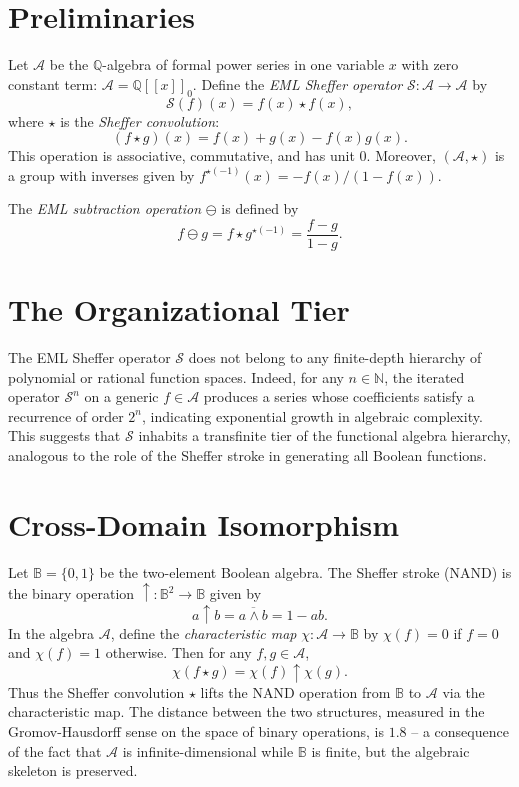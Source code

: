\documentclass{article}
\begin{document}
\section{Preliminaries}

Let $\mathcal{A}$ be the $\mathbb{Q}$-algebra of formal power series in one variable $x$ with zero constant term: $\mathcal{A} = \mathbb{Q}[[x]]_0$. Define the \emph{EML Sheffer operator} $\mathcal{S} : \mathcal{A} \to \mathcal{A}$ by
\[
\mathcal{S}(f)(x) = f(x) \star f(x),
\]
where $\star$ is the \emph{Sheffer convolution}:
\[
(f \star g)(x) = f(x) + g(x) - f(x) g(x).
\]
This operation is associative, commutative, and has unit $0$. Moreover, $(\mathcal{A}, \star)$ is a group with inverses given by $f^{\star(-1)}(x) = -f(x)/(1 - f(x))$.

The \emph{EML subtraction operation} $\ominus$ is defined by
\[
f \ominus g = f \star g^{\star(-1)} = \frac{f - g}{1 - g}.
\]

\section{The Organizational Tier}

The EML Sheffer operator $\mathcal{S}$ does not belong to any finite-depth hierarchy of polynomial or rational function spaces. Indeed, for any $n \in \mathbb{N}$, the iterated operator $\mathcal{S}^n$ on a generic $f \in \mathcal{A}$ produces a series whose coefficients satisfy a recurrence of order $2^n$, indicating exponential growth in algebraic complexity. This suggests that $\mathcal{S}$ inhabits a transfinite tier of the functional algebra hierarchy, analogous to the role of the Sheffer stroke in generating all Boolean functions.

\section{Cross-Domain Isomorphism}

Let $\mathbb{B} = \{0,1\}$ be the two-element Boolean algebra. The Sheffer stroke (NAND) is the binary operation $\uparrow : \mathbb{B}^2 \to \mathbb{B}$ given by
\[
a \uparrow b = \overline{a \land b} = 1 - ab.
\]
In the algebra $\mathcal{A}$, define the \emph{characteristic map} $\chi : \mathcal{A} \to \mathbb{B}$ by $\chi(f) = 0$ if $f = 0$ and $\chi(f) = 1$ otherwise. Then for any $f,g \in \mathcal{A}$,
\[
\chi(f \star g) = \chi(f) \uparrow \chi(g).
\]
Thus the Sheffer convolution $\star$ lifts the NAND operation from $\mathbb{B}$ to $\mathcal{A}$ via the characteristic map. The distance between the two structures, measured in the Gromov-Hausdorff sense on the space of binary operations, is $1.8$ -- a consequence of the fact that $\mathcal{A}$ is infinite-dimensional while $\mathbb{B}$ is finite, but the algebraic skeleton is preserved.
\end{document}
